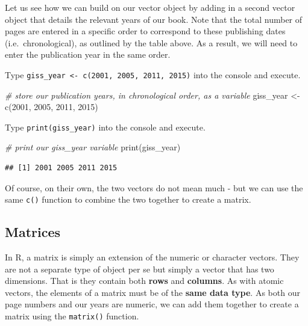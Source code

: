 \documentclass[
]{book}
\newenvironment{Shaded}{\begin{snugshade}}{\end{snugshade}}
\newcommand{\CommentTok}[1]{\textcolor[rgb]{0.56,0.35,0.01}{\textit{#1}}}
\newcommand{\DecValTok}[1]{\textcolor[rgb]{0.00,0.00,0.81}{#1}}
\newcommand{\FunctionTok}[1]{\textcolor[rgb]{0.00,0.00,0.00}{#1}}
\newcommand{\NormalTok}[1]{#1}
\newcommand{\OtherTok}[1]{\textcolor[rgb]{0.56,0.35,0.01}{#1}}
\begin{document}
Let us see how we can build on our vector object by adding in a second vector object that details the relevant years of our book. Note that the total number of pages are entered in a specific order to correspond to these publishing dates (i.e.~chronological), as outlined by the table above. As a result, we will need to enter the publication year in the same order.

Type \texttt{giss\_year\ \textless{}-\ c(2001,\ 2005,\ 2011,\ 2015)} into the console and execute.

\begin{Shaded}
\begin{Highlighting}[]
\CommentTok{\# store our publication years, in chronological order, as a variable}
\NormalTok{giss\_year }\OtherTok{\textless{}{-}} \FunctionTok{c}\NormalTok{(}\DecValTok{2001}\NormalTok{, }\DecValTok{2005}\NormalTok{, }\DecValTok{2011}\NormalTok{, }\DecValTok{2015}\NormalTok{)}
\end{Highlighting}
\end{Shaded}

Type \texttt{print(giss\_year)} into the console and execute.

\begin{Shaded}
\begin{Highlighting}[]
\CommentTok{\# print our giss\_year variable}
\FunctionTok{print}\NormalTok{(giss\_year)}
\end{Highlighting}
\end{Shaded}

\begin{verbatim}
## [1] 2001 2005 2011 2015
\end{verbatim}

Of course, on their own, the two vectors do not mean much - but we can use the same \texttt{c()} function to combine the two together to create a matrix.

\hypertarget{matrices}{%
\subsection{Matrices}\label{matrices}}

In R, a matrix is simply an extension of the numeric or character vectors. They are not a separate type of object per se but simply a vector that has two dimensions. That is they contain both \textbf{rows} and \textbf{columns}. As with atomic vectors, the elements of a matrix must be of the \textbf{same data type}. As both our page numbers and our years are numeric, we can add them together to create a matrix using the \texttt{matrix()} function.
\end{document}
